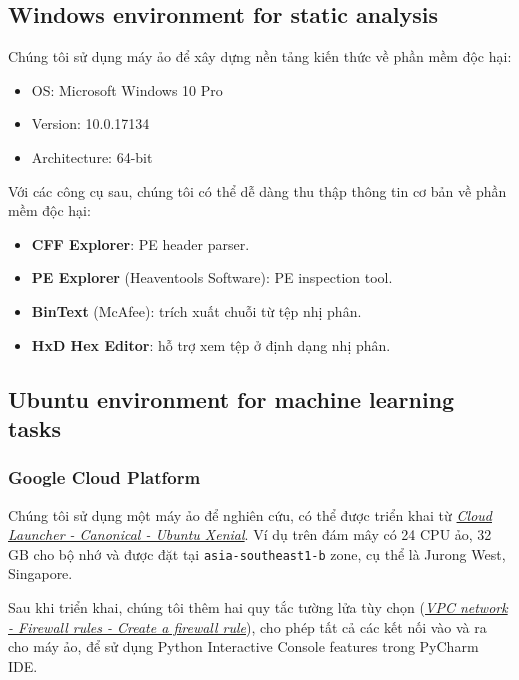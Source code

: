 \subsection{Windows environment for static analysis}

Chúng tôi sử dụng máy ảo để xây dựng nền tảng kiến thức về phần mềm độc hại:

\begin{itemize}
\item OS: Microsoft Windows 10 Pro
\item Version: 10.0.17134
\item Architecture: 64-bit
\end{itemize}

Với các công cụ sau, chúng tôi có thể dễ dàng thu thập thông tin cơ bản về phần mềm độc hại:

\begin{itemize}
 \item \textbf{CFF Explorer}: PE header parser.
 \item \textbf{PE Explorer} (Heaventools Software): PE inspection tool.
 \item \textbf{BinText} (McAfee): trích xuất chuỗi từ tệp nhị phân.
 \item \textbf{HxD Hex Editor}: hỗ trợ xem tệp ở định dạng nhị phân.
\end{itemize}

\subsection{Ubuntu environment for machine learning tasks}

\subsubsection{Google Cloud Platform}

Chúng tôi sử dụng một máy ảo để nghiên cứu, có thể được triển khai từ \textit{\href{https://console.cloud.google.com/launcher/details/ubuntu-os-cloud/ubuntu-xenial}{Cloud Launcher - Canonical - Ubuntu Xenial}}. Ví dụ trên đám mây có 24 CPU ảo, 32 GB cho bộ nhớ và được đặt tại \verb|asia-southeast1-b| zone, cụ thể là Jurong West, Singapore.

Sau khi triển khai, chúng tôi thêm hai quy tắc tường lửa tùy chọn (\textit{\href{https://console.cloud.google.com/networking/firewalls/add}{VPC network - Firewall rules - Create a firewall rule}}), cho phép tất cả các kết nối vào và ra cho máy ảo, để sử dụng Python Interactive Console features trong PyCharm IDE.

